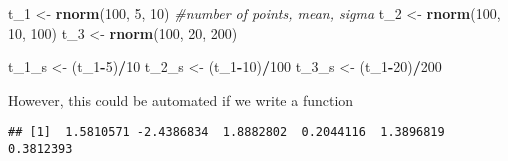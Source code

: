 \documentclass[11pt,]{article}
\newenvironment{Shaded}{\begin{snugshade}}{\end{snugshade}}
\newcommand{\KeywordTok}[1]{\textcolor[rgb]{0.13,0.29,0.53}{\textbf{#1}}}
\newcommand{\DecValTok}[1]{\textcolor[rgb]{0.00,0.00,0.81}{#1}}
\newcommand{\StringTok}[1]{\textcolor[rgb]{0.31,0.60,0.02}{#1}}
\newcommand{\CommentTok}[1]{\textcolor[rgb]{0.56,0.35,0.01}{\textit{#1}}}
\newcommand{\ControlFlowTok}[1]{\textcolor[rgb]{0.13,0.29,0.53}{\textbf{#1}}}
\newcommand{\OperatorTok}[1]{\textcolor[rgb]{0.81,0.36,0.00}{\textbf{#1}}}
\newcommand{\NormalTok}[1]{#1}
\begin{document}
\begin{Shaded}
\begin{Highlighting}[]
\NormalTok{t_}\DecValTok{1}\NormalTok{ <-}\StringTok{ }\KeywordTok{rnorm}\NormalTok{(}\DecValTok{100}\NormalTok{, }\DecValTok{5}\NormalTok{, }\DecValTok{10}\NormalTok{) }\CommentTok{#number of points, mean, sigma}
\NormalTok{t_}\DecValTok{2}\NormalTok{ <-}\StringTok{ }\KeywordTok{rnorm}\NormalTok{(}\DecValTok{100}\NormalTok{, }\DecValTok{10}\NormalTok{, }\DecValTok{100}\NormalTok{)}
\NormalTok{t_}\DecValTok{3}\NormalTok{ <-}\StringTok{ }\KeywordTok{rnorm}\NormalTok{(}\DecValTok{100}\NormalTok{, }\DecValTok{20}\NormalTok{, }\DecValTok{200}\NormalTok{)}

\NormalTok{t_1_s <-}\StringTok{ }\NormalTok{(t_}\DecValTok{1}\OperatorTok{-}\DecValTok{5}\NormalTok{)}\OperatorTok{/}\DecValTok{10} 
\NormalTok{t_2_s <-}\StringTok{ }\NormalTok{(t_}\DecValTok{1}\OperatorTok{-}\DecValTok{10}\NormalTok{)}\OperatorTok{/}\DecValTok{100}
\NormalTok{t_3_s <-}\StringTok{ }\NormalTok{(t_}\DecValTok{1}\OperatorTok{-}\DecValTok{20}\NormalTok{)}\OperatorTok{/}\DecValTok{200}
\end{Highlighting}
\end{Shaded}

However, this could be automated if we write a function

\begin{Shaded}
\end{Shaded}

\begin{verbatim}
## [1]  1.5810571 -2.4386834  1.8882802  0.2044116  1.3896819  0.3812393
\end{verbatim}

\begin{Shaded}
\end{Shaded}
\end{document}
